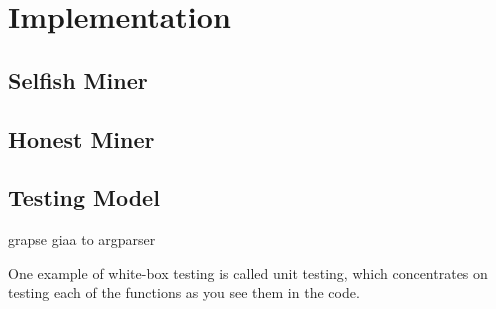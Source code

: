 \chapter{Implementation}
\label{sec:implementation}
\minitoc
\vspace*{1cm}

\section{Selfish Miner}

\section{Honest Miner}

\section{Testing Model}
grapse giaa to argparser

One example of white-box testing is called unit testing, which concentrates
on testing each of the functions as you see them in the code.